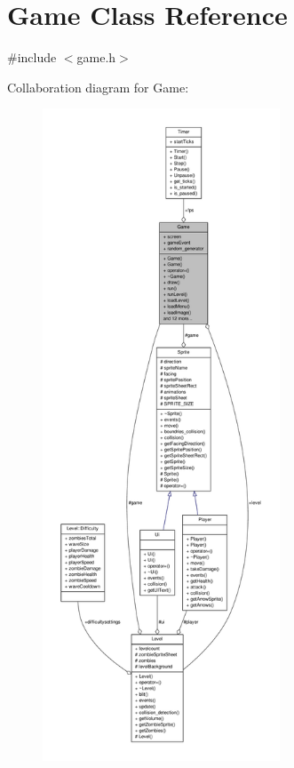 \hypertarget{classGame}{\section{Game Class Reference}
\label{classGame}
}


{\ttfamily \#include $<$game.\-h$>$}



Collaboration diagram for Game\-:
\nopagebreak
\begin{figure}[H]
\begin{center}
\leavevmode
\includegraphics[height=550pt]{classGame__coll__graph}
\end{center}
\end{figure}
